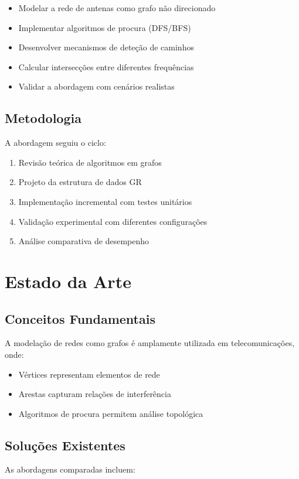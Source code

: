 \documentclass[a4paper,12pt]{report}
\begin{document}
\begin{itemize}
    \item Modelar a rede de antenas como grafo não direcionado
    \item Implementar algoritmos de procura (DFS/BFS)
    \item Desenvolver mecanismos de deteção de caminhos
    \item Calcular intersecções entre diferentes frequências
    \item Validar a abordagem com cenários realistas
\end{itemize}

\section{Metodologia}
A abordagem seguiu o ciclo:

\begin{enumerate}
    \item Revisão teórica de algoritmos em grafos
    \item Projeto da estrutura de dados GR
    \item Implementação incremental com testes unitários
    \item Validação experimental com diferentes configurações
    \item Análise comparativa de desempenho
\end{enumerate}

\chapter{Estado da Arte}
\section{Conceitos Fundamentais}
A modelação de redes como grafos é amplamente utilizada em telecomunicações, onde:

\begin{itemize}
    \item Vértices representam elementos de rede
    \item Arestas capturam relações de interferência
    \item Algoritmos de procura permitem análise topológica
\end{itemize}

\section{Soluções Existentes}
As abordagens comparadas incluem:
\end{document}
